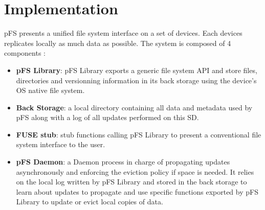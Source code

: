 
\section{Implementation}
\label{sec:impl}

pFS presents a unified file system interface on a set of devices. Each
devices replicates locally as much data as possible. The system is
composed of 4 components :
\begin{itemize}
\item \textbf{pFS Library}: pFS Library exports a generic file system
  API and store files, directories and versionning information in its
  back storage using the device's OS native file system.
\item \textbf{Back Storage}: a local directory containing all data and
  metadata used by pFS along with a log of all updates performed on
  this SD.
\item \textbf{FUSE stub}: stub functions calling pFS Library to
  present a conventional file system interface to the user.
\item \textbf{pFS Daemon}: a Daemon process in charge of propagating
  updates asynchronously and enforcing the eviction policy if space is
  needed. It relies on the local log written by pFS Library and stored
  in the back storage to learn about updates to propagate and use
  specific functions exported by pFS Library to update or evict local
  copies of data.
\end{itemize}


